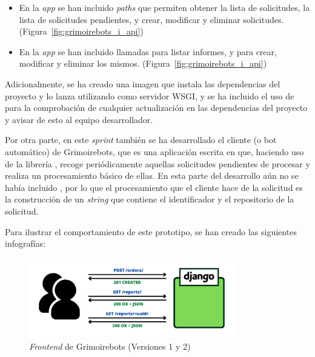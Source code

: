 \begin{itemize}
    \item En la \emph{app}  se han incluido \emph{paths} que permiten obtener la lista de solicitudes, la lista de solicitudes pendientes, y crear, modificar y eliminar solicitudes. (Figura~\ref{fig:grimoirebots_i_api})
    \item En la \emph{app}  se han incluido llamadas para listar informes, y para crear, modificar y eliminar los mismos. (Figura~\ref{fig:grimoirebots_i_api})
\end{itemize}

Adicionalmente, se ha creado una imagen  que instala las dependencias del proyecto y lo lanza utilizando  como servidor WSGI, y se ha incluido el uso de  para la comprobación de cualquier actualización en las dependencias del proyecto y avisar de esto al equipo desarrollador.

Por otra parte, en este \emph{sprint} también se ha desarrollado el cliente (o bot automático) de Grimoirebots, que es una aplicación escrita en  que, haciendo uso de la librería , recoge periódicamente aquellas solicitudes pendientes de procesar y realiza un procesamiento básico de ellas. En esta parte del desarrollo aún no se había incluido , por lo que el procesamiento que el cliente hace de la solicitud es la construcción de un \emph{string} que contiene el identificador y el repositorio de la solicitud.

Para ilustrar el comportamiento de este prototipo, se han creado las siguientes infografías:

\begin{figure}[ht]
    \centering
    \includegraphics[width=0.8\textwidth]{Figures/grimoirebots_frontend}
    \decoRule
    \caption[Grimoirebots (\emph{Frontend})]{\emph{Frontend} de Grimoirebots (Versiones 1 y 2)}
    \label{fig:grimoirebots_frontend}
\end{figure}

